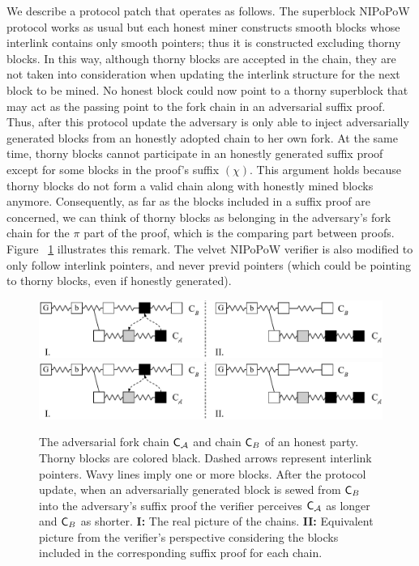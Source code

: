 We describe a protocol patch that operates as follows. The superblock NIPoPoW protocol works as usual but each honest miner constructs smooth blocks whose interlink contains only smooth pointers; thus it is constructed excluding thorny blocks. In this way, although thorny blocks are accepted in the chain, they are not taken into consideration when updating the interlink structure for the next block to be mined. No honest block could now point to a thorny superblock that may act as the passing point to the fork chain in an adversarial suffix proof. Thus, after this protocol update the adversary is only able to inject adversarially generated blocks from an honestly adopted chain to her own fork.
At the same time, thorny blocks cannot participate in an honestly generated suffix proof except for some blocks in the proof's suffix $(\chi)$. This argument holds because thorny blocks do not form a valid chain along with honestly mined blocks anymore. Consequently, as far as the blocks included in a suffix proof are concerned, we can think of thorny blocks as belonging in the adversary's fork chain for the $\pi$ part of the proof,  which is the comparing part between proofs. Figure~
\ref{fig:injection} illustrates this remark. The velvet NIPoPoW verifier is also modified to only follow interlink pointers, and never previd pointers (which could be pointing to thorny blocks, even if honestly generated).

\begin{figure}[h!]
	\begin{center}
		\iftwocolumn
			\includegraphics[width=0.8 \textwidth]{figures/injection.pdf}
		\else
			\includegraphics[width=0.8 \textwidth]{figures/injection.pdf}
		\fi
	\end{center}
	\caption{The adversarial fork chain $\mathsf{C}_\mathcal{A}$ and chain $\mathsf{C}_B$ of an honest party. Thorny blocks are colored black. Dashed arrows represent interlink pointers. Wavy lines imply one or more blocks. After the protocol update, when an adversarially generated block is sewed from $\mathsf{C}_B$ into the adversary's suffix proof the verifier perceives $\mathsf{C}_\mathcal{A}$ as longer and $\mathsf{C}_B$ as shorter. \textbf{I:} The real picture of the chains. \textbf{II:} Equivalent picture from the verifier's perspective considering the blocks included in the corresponding suffix proof for each chain.}
	\label{fig:injection}
\end{figure}

